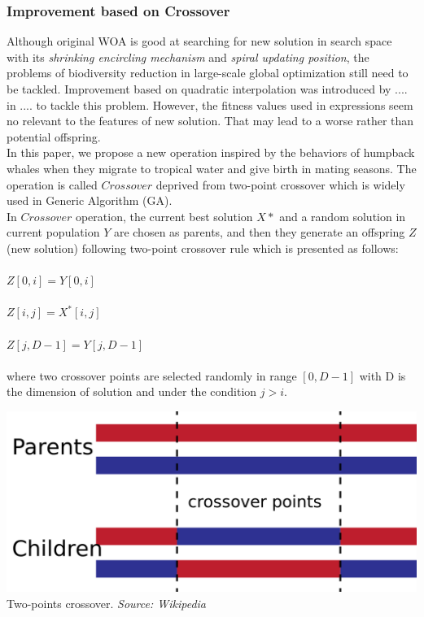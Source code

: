 \documentclass[a4paper]{article}
\begin{document}
\subsubsection{Improvement based on Crossover}
Although original WOA is good at searching for new solution in search space with its \textit{shrinking encircling mechanism} and \textit{spiral updating position}, the problems of biodiversity reduction in large-scale global optimization still need to be tackled. Improvement based on quadratic interpolation was introduced by .... in .... to tackle this problem. However, the fitness values used in expressions seem no relevant to the features of new solution. That may lead to a worse rather than potential offspring. \\ 
In this paper, we propose a new operation inspired by the behaviors of humpback whales when they migrate to tropical water and give birth in mating seasons. The operation is called $Crossover$ deprived from two-point crossover which is widely used in Generic Algorithm (GA). \\
In $Crossover$ operation, the current best solution $X*$ and a random solution in current population $Y$ are chosen as parents, and then they generate an offspring $Z$ (new solution) following two-point crossover rule which is presented as follows: \\ \\
$Z[0,i] = Y[0,i]$ \\ \\
$Z[i,j] = X^*[i,j]$ \\ \\
$Z[j,D-1] = Y[j,D-1]$ \\ \\
where two crossover points are selected randomly in range $[0, D-1]$ with D is the dimension of solution and under the condition $j > i$. \\
\begin{center} 
\includegraphics[scale=0.2]{2pcrossover} \\
Two-points crossover. \textit{Source: Wikipedia}
\end{center}
\end{document}

